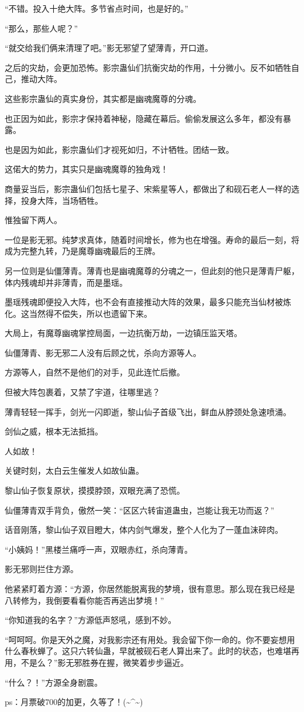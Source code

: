 \begin{this_body}
“不错。投入十绝大阵。多节省点时间，也是好的。”

“那么，那些人呢？”

“就交给我们俩来清理了吧。”影无邪望了望薄青，开口道。

之后的灾劫，会更加恐怖。影宗蛊仙们抗衡灾劫的作用，十分微小。反不如牺牲自己，推动大阵。

这些影宗蛊仙的真实身份，其实都是幽魂魔尊的分魂。

也正因为如此，影宗才保持着神秘，隐藏在幕后。偷偷发展这么多年，都没有暴露。

也是因为如此，影宗蛊仙们才视死如归，不计牺牲。团结一致。

这偌大的势力，其实只是幽魂魔尊的独角戏！

商量妥当后，影宗蛊仙们包括七星子、宋紫星等人，都做出了和砚石老人一样的选择，投身大阵，当场牺牲。

惟独留下两人。

一位是影无邪。纯梦求真体，随着时间增长，修为也在增强。寿命的最后一刻，将成为完整九转，乃是魔尊幽魂最后的王牌。

另一位则是仙僵薄青。薄青也是幽魂魔尊的分魂之一，但此刻的他只是薄青尸躯，体内残魂却并非薄青，而是墨瑶。

墨瑶残魂即便投入大阵，也不会有直接推动大阵的效果，最多只能充当仙材被炼化。这当然得不偿失，所以也遗留下来。

大局上，有魔尊幽魂掌控局面，一边抗衡万劫，一边镇压监天塔。

仙僵薄青、影无邪二人没有后顾之忧，杀向方源等人。

方源等人，自然不是他们的对手，见此连忙后撤。

但被大阵包裹着，又禁了宇道，往哪里逃？

薄青轻轻一挥手，剑光一闪即逝，黎山仙子首级飞出，鲜血从脖颈处急速喷涌。

剑仙之威，根本无法抵挡。

人如故！

关键时刻，太白云生催发人如故仙蛊。

黎山仙子恢复原状，摸摸脖颈，双眼充满了恐慌。

仙僵薄青双手背负，傲然一笑：“区区六转宙道蛊虫，岂能让我无功而返？”

话音刚落，黎山仙子双目瞪大，体内剑气爆发，整个人化为了一蓬血沫碎肉。

“小姨妈！”黑楼兰痛呼一声，双眼赤红，杀向薄青。

影无邪则拦住方源。

他紧紧盯着方源：“方源，你居然能脱离我的梦境，很有意思。那么现在我已经是八转修为，我倒要看看你能否再逃出梦境！”

“你知道我的名字？”方源低声怒吼，感到不妙。

“呵呵呵。你是天外之魔，对我影宗还有用处。我会留下你一命的。你不要妄想用什么春秋蝉了。这只六转仙蛊，早就被砚石老人算出来了。此时的状态，也难堪再用，不是么？”影无邪胜券在握，微笑着步步逼近。

“什么？！”方源全身剧震。

ps：月票破700的加更，久等了！(\~{}\^{}\~{})

\end{this_body}


